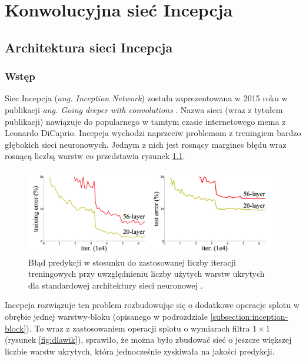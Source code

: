 \chapter{Konwolucyjna sieć Incepcja}
\label{chap:inception}

\section{Architektura sieci Incepcja}

\subsection{Wstęp}
Siec Incepcja (\textit{ang. Inception Network}) została zaprezentowana w 2015 roku w publikacji \textit{ang. Going deeper with convolutions} \cite{inceptionpaper}. 
Nazwa sieci (wraz z tytułem publikacji) nawiązuje do popularnego w tamtym czasie internetowego mema z Leonardo DiCaprio. 
Incepcja wychodzi naprzeciw problemom z treningiem bardzo głębokich sieci neuronowych. Jednym z nich jest rosnący margines błędu wraz rosnącą liczbą warstw co przedstawia rysunek \ref{fig:deep-error}.

\begin{figure}[ht]
\centerline{\includegraphics[scale=0.2]{resources/inception/deep-error.png}}
\caption{Błąd predykcji w stosunku do zastosowanej liczby iteracji treningowych przy uwzględnieniu liczby użytych warstw ukrytych dla standardowej architektury sieci neuronowej \cite{resnetpaper}.}
\label{fig:deep-error}
\end{figure}

Incepcja rozwiązuje ten problem rozbudowując się o dodatkowe operacje splotu w obrębie jednej warstwy-bloku (opisanego w podrozdziale \ref{subsection:inception-block}).
To wraz z zastosowaniem operacji splotu o wymiarach filtra \(1 \times 1\) (rysunek \ref{fig:dlawik}), sprawiło, że można było zbudować sieć o jeszcze większej liczbie warstw ukrytych, która jednocześnie zyskiwała na jakości predykcji.

